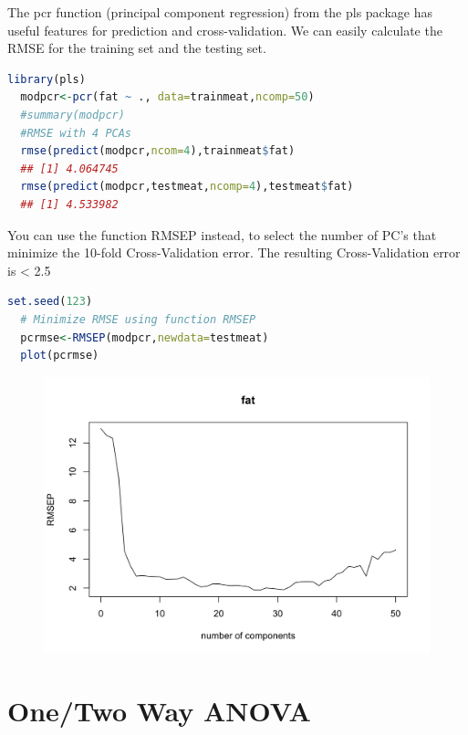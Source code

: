\documentclass[11pt,a4paper]{article}
\begin{document}
The pcr function (principal component regression) from the pls package has useful features for prediction and cross-validation. We can easily calculate the RMSE for the training set and the testing set.
\begin{lstlisting}[language=R]
  library(pls)
  modpcr<-pcr(fat ~ ., data=trainmeat,ncomp=50)
  #summary(modpcr)
  #RMSE with 4 PCAs
  rmse(predict(modpcr,ncom=4),trainmeat$fat) 
  ## [1] 4.064745
  rmse(predict(modpcr,testmeat,ncomp=4),testmeat$fat)
  ## [1] 4.533982
\end{lstlisting}
You can use the function RMSEP instead, to select the number of PC’s that minimize the 10-fold Cross-Validation error. The resulting Cross-Validation error is < 2.5
\begin{lstlisting}[language=R]
  set.seed(123)
  # Minimize RMSE using function RMSEP
  pcrmse<-RMSEP(modpcr,newdata=testmeat)
  plot(pcrmse)  
\end{lstlisting}
\begin{center}\begin{figure}[htbp]
  \centering
  \includegraphics[scale=0.3]{fat}
  \caption{}
  \label{}
\end{figure}\end{center}



\section{One/Two Way ANOVA}
\end{document}
